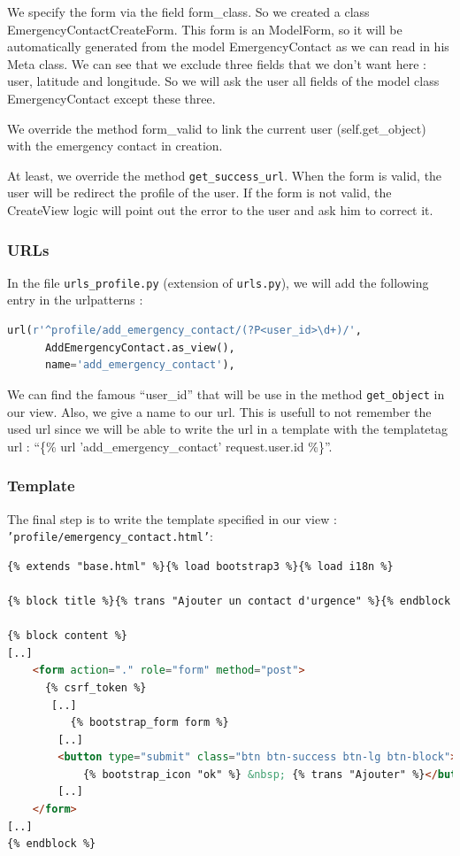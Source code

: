 \documentclass[11pt, a4paper]{article}   	%
\begin{document}
We specify the form via the field form\_class. So we created a class EmergencyContactCreateForm. This form is an ModelForm, so it will be automatically generated from the model EmergencyContact as we can read in his Meta class. We can see that we exclude three fields that we don't want here : user, latitude and longitude. So we will ask the user all fields of the model class EmergencyContact except these three.

We override the method form\_valid to link the current user (self.get\_object) with the emergency contact in creation.

At least, we override the method \texttt{get\_success\_url}. When the form is valid, the user will be redirect the profile of the user. If the form is not valid, the CreateView logic will point out the error to the user and ask him to correct it.

\subsubsection{URLs}

In the file \texttt{urls\_profile.py} (extension of \texttt{urls.py}), we will add the following entry in the urlpatterns :

\begin{lstlisting}[language=Python, basicstyle=\footnotesize]
  url(r'^profile/add_emergency_contact/(?P<user_id>\d+)/',
      AddEmergencyContact.as_view(),
      name='add_emergency_contact'), 
\end{lstlisting}

We can find the famous ``user\_id'' that will be use in the method \texttt{get\_object} in our view. Also, we give a name to our url. This is usefull to not remember the used url since we will be able to write the url in a template with the templatetag url : ``\{\% url 'add\_emergency\_contact' request.user.id \%\}''.

\subsubsection{Template}

The final step is to write the template specified in our view : \texttt{'profile/emergency\_contact.html'}:

\begin{lstlisting}[language=HTML, basicstyle=\footnotesize]
{% extends "base.html" %}{% load bootstrap3 %}{% load i18n %}

{% block title %}{% trans "Ajouter un contact d'urgence" %}{% endblock %}

{% block content %}
[..]
    <form action="." role="form" method="post">
      {% csrf_token %}
       [..]
          {% bootstrap_form form %}
        [..]
        <button type="submit" class="btn btn-success btn-lg btn-block">
            {% bootstrap_icon "ok" %} &nbsp; {% trans "Ajouter" %}</button>
        [..]
    </form>
[..]
{% endblock %}
\end{lstlisting}
\end{document}
